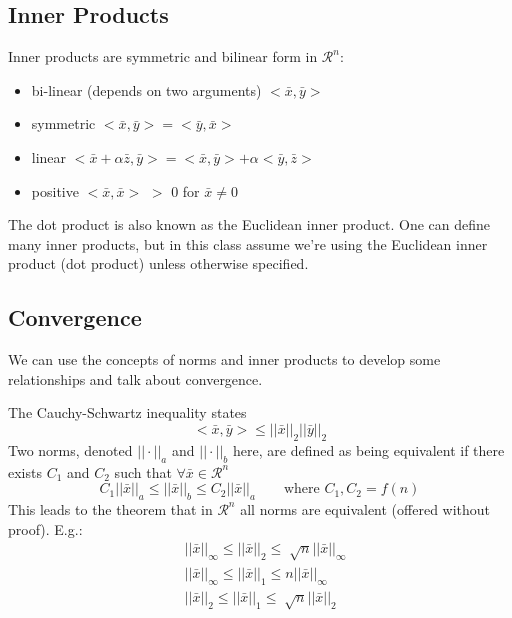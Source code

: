 \documentclass[12pt]{article}
\begin{document}
\subsection{Inner Products}
Inner products are symmetric and bilinear form in $\mathcal{R}^n$:
%
\begin{itemize}
\item bi-linear (depends on two arguments) $< \bar{x}, \bar{y} >$
\item symmetric $< \bar{x}, \bar{y} > = < \bar{y}, \bar{x} >$
\item linear $< \bar{x} + \alpha \bar{z}, \bar{y} > = < \bar{x}, \bar{y} > + \alpha < \bar{y}, \bar{z} >$
\item positive $< \bar{x}, \bar{x} >$ $>$ 0 for $\bar{x} \neq 0$
\end{itemize}

The dot product is also known as the Euclidean inner product. One can define many inner products, but in this class assume we're using the Euclidean inner product (dot product) unless otherwise specified. 

\subsection{Convergence}
We can use the concepts of norms and inner products to develop some relationships and talk about convergence. 

The Cauchy-Schwartz inequality states
%
\begin{equation}
< \bar{x}, \bar{y} > \leq ||\bar{x}||_2 ||\bar{y}||_2 \nonumber
\end{equation}
%
Two norms, denoted $|| \cdot ||_a$ and $|| \cdot ||_b$ here, are defined as being equivalent if there exists $C_1$ and $C_2$ such that $\forall \bar{x} \in \mathcal{R}^n$
%
\begin{equation}
C_1 ||\bar{x}||_a \leq ||\bar{x}||_b \leq C_2 ||\bar{x}||_a \qquad \text{where } C_1, C_2 = f(n) \nonumber
\end{equation}
%
This leads to the theorem that in $\mathcal{R}^n$ all norms are equivalent (offered without proof). E.g.:
\begin{align}
& ||\bar{x}||_{\infty} \leq ||\bar{x}||_2 \leq \sqrt[]{n} ||\bar{x}||_{\infty} \nonumber \\
%
& ||\bar{x}||_{\infty} \leq ||\bar{x}||_1 \leq n ||\bar{x}||_{\infty} \nonumber \\
%
& ||\bar{x}||_2 \leq ||\bar{x}||_1 \leq \sqrt[]{n} ||\bar{x}||_2 \nonumber
\end{align}
\end{document}

